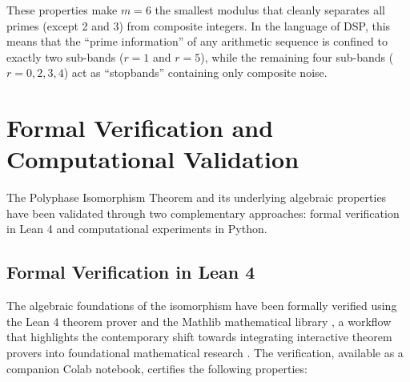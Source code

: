 \documentclass{article}
\theoremstyle{plain}
\theoremstyle{definition}
\theoremstyle{remark}
\begin{document}
These properties make \(m=6\) the smallest modulus that cleanly separates all primes (except 2 and 3) from composite integers. In the language of DSP, this means that the ``prime information'' of any arithmetic sequence is confined to exactly two sub-bands (\(r=1\) and \(r=5\)), while the remaining four sub-bands (\(r=0,2,3,4\)) act as ``stopbands'' containing only composite noise.

\section{Formal Verification and Computational Validation}
\label{sec:verification}

The Polyphase Isomorphism Theorem and its underlying algebraic properties have been validated through two complementary approaches: formal verification in Lean 4 and computational experiments in Python.

\subsection{Formal Verification in Lean 4}
\label{sec:lean}

The algebraic foundations of the isomorphism have been formally verified using the Lean 4 theorem prover and the Mathlib mathematical library \cite{mathlib}, a workflow that highlights the contemporary shift towards integrating interactive theorem provers into foundational mathematical research \cite{lean_math}. The verification, available as a companion Colab notebook, certifies the following properties:
\end{document}
